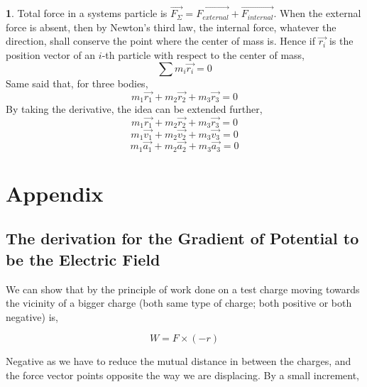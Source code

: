 \documentclass[11pt,a4paper,landscape,twocolumn]{article}
\theoremstyle{definition}
\theoremstyle{definition}
\theoremstyle{definition}
\newtheorem{idea}{ \framebox[0.05\textwidth]{{\sffamily Idea}} }
\theoremstyle{definition}
\begin{document}
\begin{idea}
Total force in a systems particle is $ \vec{F_{\Sigma}}  = \vec{F_{external}} + \vec{F_{internal}}$. When the external force is absent, then by Newton's third law, the internal force, whatever the direction, shall conserve the point where the center of mass is. Hence if $\vec{r_i}$ is the position vector of an $i$-th particle with respect to the center of mass,
\[ \sum m_i \vec{r_i} = 0 \]
Same said that, for three bodies, 
\[ m_1 \vec{r_1} + m_2 \vec{r_2} + m_3 \vec{r_3} = 0 \]
By taking the derivative, the idea can be extended further,
\[ m_1 \vec{r_1} + m_2 \vec{r_2} + m_3 \vec{r_3} = 0 \]
\[ m_1 \vec{v_1} + m_2 \vec{v_2} + m_3 \vec{v_3} = 0 \]
\[ m_1 \vec{a_1} + m_2 \vec{a_2} + m_3 \vec{a_3} = 0 \]
\end{idea}


















































\section{\small{Appendix}}
\subsection{{\small The derivation for the Gradient of Potential to be the Electric Field}}
We can show that by the principle of work done on a test charge moving towards the vicinity of a bigger charge (both same type of charge; both positive or both negative) is,

\[ W = F \times (-r) \]

Negative as we have to reduce the mutual distance in between the charges, and the force vector points opposite the way we are displacing. By a small increment,
\end{document}
